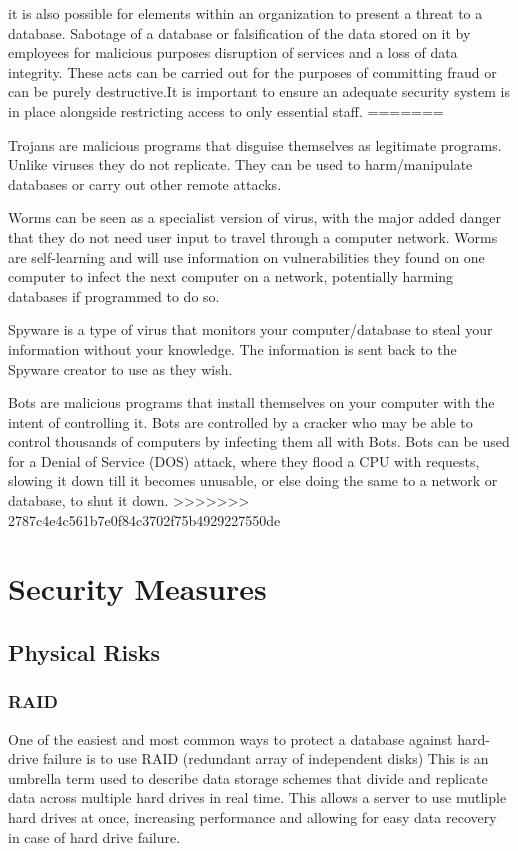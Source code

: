 \documentclass[11pt, twocolumn]{article}
\begin{document}
it is also possible for elements within an organization to present a threat to a database. Sabotage of a database or falsification of the data stored on it by  employees for malicious purposes disruption of services and a loss of data integrity. These acts can be carried out for the purposes of committing fraud or can be purely destructive.It is important to ensure an adequate security system is in place alongside restricting access to only essential staff.
=======

Trojans are malicious programs that disguise themselves as legitimate programs.  Unlike viruses they do not replicate.  They can be used to harm/manipulate databases or carry out other remote attacks\cite{Bas}.

Worms can be seen as a specialist version of virus, with the major added danger that they do not need user input to travel through a computer network. Worms are self-learning and will use information on vulnerabilities they found on one computer to infect the next computer on a network, potentially harming databases if programmed to do so\cite{Bas}.

Spyware is a type of virus that monitors your computer/database to steal your information without your knowledge.  The information is sent back to the Spyware creator to use as they wish\cite{Bas}.

Bots are malicious programs that install themselves on your computer with the intent of controlling it.  Bots are controlled by a cracker who may be able to control thousands of computers by infecting them all with Bots.  Bots can be used for a Denial of Service (DOS) attack, where they flood a CPU with requests, slowing it down till it becomes unusable, or else doing the same to a network or database, to shut it down\cite{Bas}. 
>>>>>>> 2787c4e4c561b7e0f84c3702f75b4929227550de


\section{Security Measures}
\subsection{Physical Risks}

\subsubsection{RAID}

One of the easiest and most common ways to protect a database against hard-drive failure is to use RAID (redundant array of independent disks)\cite{raid} This is an umbrella term used to describe data storage schemes that divide and replicate data across multiple hard drives in real time. This allows a server to use mutliple hard drives at once, increasing performance and allowing for easy data recovery in case of hard drive failure.
\end{document}
